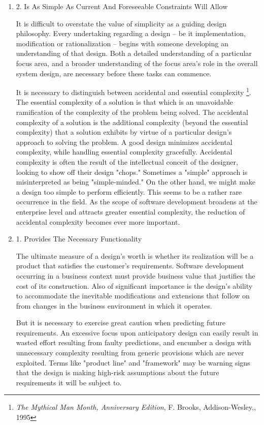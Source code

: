 \documentclass{article}
\begin{document}
\begin{enumerate}
\item 2. Is As Simple As Current And Foreseeable Constraints Will Allow
\label{sec:orgheadline245}

It is difficult to overstate the value of simplicity as a guiding design
philosophy. Every undertaking regarding a design -- be it
implementation, modification or rationalization -- begins with someone
developing an understanding of that design. Both a detailed
understanding of a particular focus area, and a broader understanding of
the focus area's role in the overall system design, are necessary before
these tasks can commence.

It is necessary to distinguish between accidental and essential
complexity \footnote{\emph{The Mythical Man Month, Anniversary Edition}, F. Brooks,
Addison-Wesley,, 1995}. The essential complexity of a solution is that which is
an unavoidable ramification of the complexity of the problem being
solved. The accidental complexity of a solution is the additional
complexity (beyond the essential complexity) that a solution exhibits by
virtue of a particular design's approach to solving the problem. A good
design minimizes accidental complexity, while handling essential
complexity gracefully. Accidental complexity is often the result of the
intellectual conceit of the designer, looking to show off their design
"chops." Sometimes a "simple" approach is misinterpreted as being
"simple-minded." On the other hand, we might make a design too simple to
perform efficiently. This seems to be a rather rare occurrence in the
field. As the scope of software development broadens at the enterprise
level and attracts greater essential complexity, the reduction of
accidental complexity becomes ever more important.

\item 1. Provides The Necessary Functionality
\label{sec:orgheadline246}

The ultimate measure of a design's worth is whether its realization will
be a product that satisfies the customer's requirements. Software
development occurring in a business context must provide business value
that justifies the cost of its construction. Also of significant
importance is the design's ability to accommodate the inevitable
modifications and extensions that follow on from changes in the business
environment in which it operates.

But it is necessary to exercise great caution when predicting future
requirements. An excessive focus upon anticipatory design can easily
result in wasted effort resulting from faulty predictions, and encumber
a design with unnecessary complexity resulting from generic provisions
which are never exploited. Terms like "product line" and "framework" may
be warning signs that the design is making high-risk assumptions about
the future requirements it will be subject to.


\end{enumerate}
\end{document}
